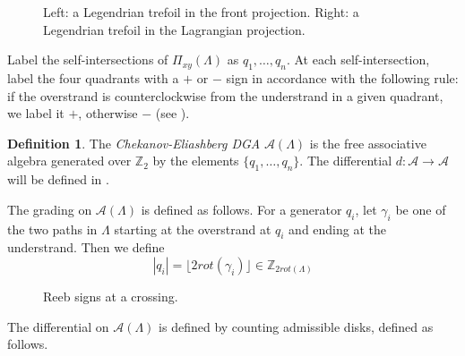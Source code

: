 \documentclass[a4paper,final, reqno]{amsart}
\theoremstyle{plain}
\theoremstyle{definition}
\newtheorem{Def}[Th]{Definition}
\newcommand{\A}{\mathcal{A}}
\begin{document}
\begin{figure}
		\caption[A Legendrian trefoil in the front and Lagrangian projections]{Left: a Legendrian trefoil in the front projection. Right: a Legendrian trefoil in the Lagrangian projection.}\label{fig:frontandlag}
	\end{figure}
	
	Label the self-intersections of $\Pi_{xy}(\Lambda)$ as $q_1, \dots, q_n$. At each self-intersection, label the four quadrants with a $+$ or $-$ sign in accordance with the following rule: if the overstrand is counterclockwise from the understrand in a given quadrant, we label it $+$, otherwise $-$ (see ).
	
	\begin{Def}
		The \emph{Chekanov-Eliashberg DGA} $\A(\Lambda)$ is the free associative algebra generated over $\mathbb{Z}_2$ by the elements $\{q_1,\dots, q_n\}$. The differential $d:\A \to \A$ will be defined in .
	\end{Def}
	
	The grading on $\A(\Lambda)$ is defined as follows. For a generator $q_i$, let $\gamma_i$ be one of the two paths in $\Lambda$ starting at the overstrand at $q_i$ and ending at the understrand. Then we define
	\[ |q_i| = \lfloor 2 rot(\gamma_i) \rfloor \in \mathbb{Z}_{2rot(\Lambda)}\]
	
	
	
	\begin{figure}
		\caption[Reeb signs at a crossing]{Reeb signs at a crossing.}\label{fig:reebsigns}
	\end{figure}
	
	
	
	
	
	The differential on $\A(\Lambda)$ is defined by counting admissible disks, defined as follows. 
	
\end{document}
